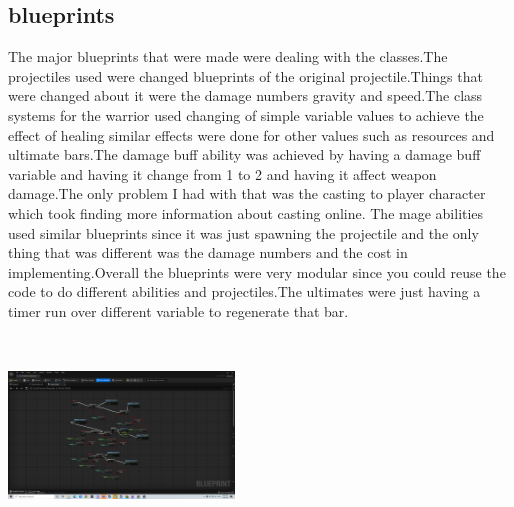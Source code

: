 \documentclass{sigchi}
\begin{document}
\subsection{blueprints}
The major blueprints that were made were dealing with the classes.The projectiles used were changed blueprints of the original projectile.Things that were changed about it were the damage numbers gravity and speed.The class systems for the warrior used changing of simple variable values to achieve the effect of healing similar effects were done for other values such as resources and ultimate bars.The damage buff ability was achieved by having a damage buff variable  and having it change from 1 to 2 and having it affect weapon damage.The only problem I had with that was the casting to player character which took finding more information about casting online.
The mage abilities used similar blueprints since it was just spawning the projectile and the only thing that was different was the damage numbers and the cost in implementing.Overall the blueprints were very modular since you could reuse the code to do different abilities and projectiles.The ultimates were just having a timer run over different variable to regenerate that bar.\\
\includegraphics[width=6cm, height=6cm]{Figure/blueprint.png}\\ \\ 
\end{document}
